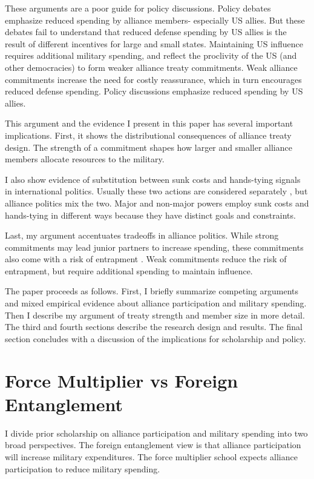 \documentclass[12pt]{article}
\begin{document}
These arguments are a poor guide for policy discussions. 
Policy debates emphasize reduced spending by alliance members- especially US allies. 
But these debates fail to understand that reduced defense spending by US allies is the result of different incentives for large and small states. 
Maintaining US influence requires additional military spending, and reflect the proclivity of the US (and other democracies) to form weaker alliance treaty commitments. 
Weak alliance commitments increase the need for costly reassurance, which in turn encourages reduced defense spending. 
Policy discussions emphasize reduced spending by US allies.  


This argument and the evidence I present in this paper has several important implications. 
First, it shows the distributional consequences of alliance treaty design. 
The strength of a commitment shapes how larger and smaller alliance members allocate resources to the military. 


I also show evidence of substitution between sunk costs and hands-tying signals in international politics. 
Usually these two actions are considered separately \citep{Fearon1997, FuhrmannSechser2014}, but alliance politics mix the two. 
Major and non-major powers employ sunk costs and hands-tying in different ways because they have distinct goals and constraints. 


Last, my argument accentuates tradeoffs in alliance politics.
While strong commitments may lead junior partners to increase spending, these commitments also come with a risk of entrapment \citep{Benson2012}.
Weak commitments reduce the risk of entrapment, but require additional spending to maintain influence.


The paper proceeds as follows. 
First, I briefly summarize competing arguments and mixed empirical evidence about alliance participation and military spending. 
Then I describe my argument of treaty strength and member size in more detail. 
The third and fourth sections describe the research design and results. 
The final section concludes with a discussion of the implications for scholarship and policy.  


\section{Force Multiplier vs Foreign Entanglement}


I divide prior scholarship on alliance participation and military spending into two broad perspectives. 
The foreign entanglement view is that alliance participation will increase military expenditures.
The force multiplier school expects alliance participation to reduce military spending. 
\end{document}
